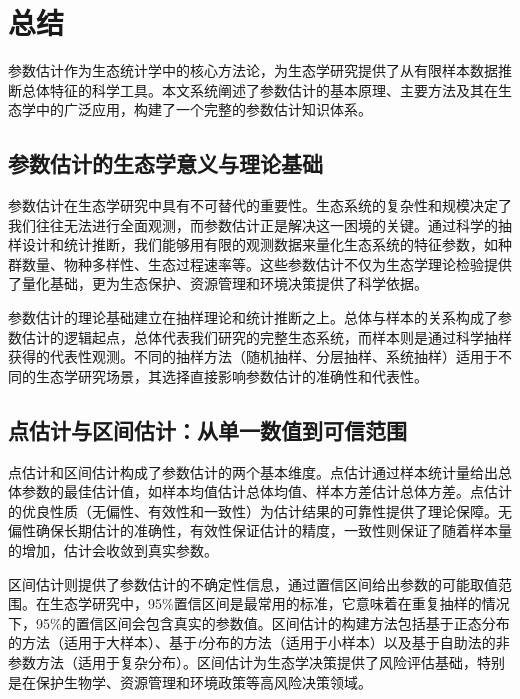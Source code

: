 \documentclass[
  twoside,12pt,fontset=none]{ctexbook}
\begin{document}
\hypertarget{ux603bux7ed3-3}{%
\section{总结}\label{ux603bux7ed3-3}}

参数估计作为生态统计学中的核心方法论，为生态学研究提供了从有限样本数据推断总体特征的科学工具。本文系统阐述了参数估计的基本原理、主要方法及其在生态学中的广泛应用，构建了一个完整的参数估计知识体系。

\hypertarget{ux53c2ux6570ux4f30ux8ba1ux7684ux751fux6001ux5b66ux610fux4e49ux4e0eux7406ux8bbaux57faux7840}{%
\subsection{参数估计的生态学意义与理论基础}\label{ux53c2ux6570ux4f30ux8ba1ux7684ux751fux6001ux5b66ux610fux4e49ux4e0eux7406ux8bbaux57faux7840}}

参数估计在生态学研究中具有不可替代的重要性。生态系统的复杂性和规模决定了我们往往无法进行全面观测，而参数估计正是解决这一困境的关键。通过科学的抽样设计和统计推断，我们能够用有限的观测数据来量化生态系统的特征参数，如种群数量、物种多样性、生态过程速率等。这些参数估计不仅为生态学理论检验提供了量化基础，更为生态保护、资源管理和环境决策提供了科学依据。

参数估计的理论基础建立在抽样理论和统计推断之上。总体与样本的关系构成了参数估计的逻辑起点，总体代表我们研究的完整生态系统，而样本则是通过科学抽样获得的代表性观测。不同的抽样方法（随机抽样、分层抽样、系统抽样）适用于不同的生态学研究场景，其选择直接影响参数估计的准确性和代表性。

\hypertarget{ux70b9ux4f30ux8ba1ux4e0eux533aux95f4ux4f30ux8ba1ux4eceux5355ux4e00ux6570ux503cux5230ux53efux4fe1ux8303ux56f4}{%
\subsection{点估计与区间估计：从单一数值到可信范围}\label{ux70b9ux4f30ux8ba1ux4e0eux533aux95f4ux4f30ux8ba1ux4eceux5355ux4e00ux6570ux503cux5230ux53efux4fe1ux8303ux56f4}}

点估计和区间估计构成了参数估计的两个基本维度。点估计通过样本统计量给出总体参数的最佳估计值，如样本均值估计总体均值、样本方差估计总体方差。点估计的优良性质（无偏性、有效性和一致性）为估计结果的可靠性提供了理论保障。无偏性确保长期估计的准确性，有效性保证估计的精度，一致性则保证了随着样本量的增加，估计会收敛到真实参数。

区间估计则提供了参数估计的不确定性信息，通过置信区间给出参数的可能取值范围。在生态学研究中，95\%置信区间是最常用的标准，它意味着在重复抽样的情况下，95\%的置信区间会包含真实的参数值。区间估计的构建方法包括基于正态分布的方法（适用于大样本）、基于\emph{t}分布的方法（适用于小样本）以及基于自助法的非参数方法（适用于复杂分布）。区间估计为生态学决策提供了风险评估基础，特别是在保护生物学、资源管理和环境政策等高风险决策领域。
\end{document}
